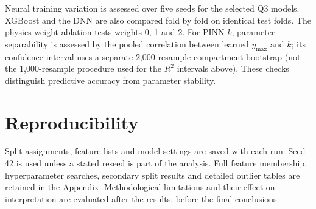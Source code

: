 Neural training variation is assessed over five seeds for the selected Q3 models. XGBoost and the
DNN are also compared fold by fold on identical test folds. The physics-weight ablation tests
weights 0, 1 and 2. For PINN-$k$, parameter separability is assessed by the pooled correlation
between learned $y_{\max}$ and $k$; its confidence interval uses a separate 2,000-resample compartment
bootstrap (not the 1,000-resample procedure used for the $R^2$ intervals above). These checks distinguish predictive accuracy from parameter stability.

\section{Reproducibility}

Split assignments, feature lists and model settings are saved with each run. Seed 42 is used unless
a stated reseed is part of the analysis. Full feature membership, hyperparameter searches,
secondary split results and detailed outlier tables are retained in the Appendix. Methodological
limitations and their effect on interpretation are evaluated after the results, before the final
conclusions.

